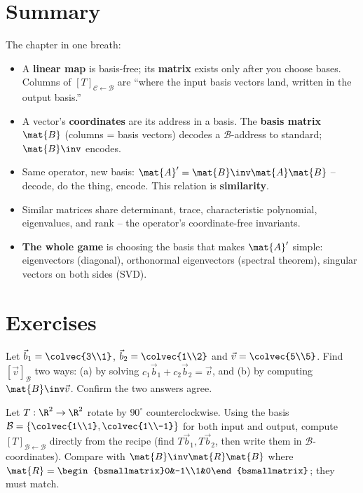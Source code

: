 \section{Summary}
\label{ch31:summary}

\begin{focusbox}
The chapter in one breath:
\begin{itemize}
  \item A \textbf{linear map} is basis-free; its \textbf{matrix} exists only after
        you choose bases. Columns of $[T]_{\mathcal{C}\leftarrow\mathcal{B}}$ are
        ``where the input basis vectors land, written in the output basis.''
  \item A vector's \textbf{coordinates} are its address in a basis. The
        \textbf{basis matrix} $\mat{B}$ (columns = basis vectors) decodes a
        $\mathcal{B}$-address to standard; $\mat{B}\inv$ encodes.
  \item Same operator, new basis: $\mat{A}'=\mat{B}\inv\mat{A}\mat{B}$ -- decode,
        do the thing, encode. This relation is \textbf{similarity}.
  \item Similar matrices share determinant, trace, characteristic polynomial,
        eigenvalues, and rank -- the operator's coordinate-free invariants.
  \item \textbf{The whole game} is choosing the basis that makes $\mat{A}'$
        simple: eigenvectors (diagonal), orthonormal eigenvectors (spectral
        theorem), singular vectors on both sides (SVD).
\end{itemize}
\end{focusbox}

\section*{Exercises}

\begin{exercise}
\label{ch31:ex-address}
Let $\vec{b}_1=\colvec{3\\1}$, $\vec{b}_2=\colvec{1\\2}$ and
$\vec{v}=\colvec{5\\5}$. Find $[\vec{v}]_{\mathcal{B}}$ two ways: (a) by solving
$c_1\vec{b}_1+c_2\vec{b}_2=\vec{v}$, and (b) by computing $\mat{B}\inv\vec{v}$.
Confirm the two answers agree.
\end{exercise}

\begin{exercise}
\label{ch31:ex-build}
Let $T:\R^2\to\R^2$ rotate by $90^\circ$ counterclockwise. Using the basis
$\mathcal{B}=\{\colvec{1\\1},\colvec{1\\-1}\}$ for both input and output, compute
$[T]_{\mathcal{B}\leftarrow\mathcal{B}}$ directly from the recipe (find $T\vec{b}_1,
T\vec{b}_2$, then write them in $\mathcal{B}$-coordinates). Compare with
$\mat{B}\inv\mat{R}\mat{B}$ where $\mat{R}=\begin{bsmallmatrix}0&-1\\1&0\end{bsmallmatrix}$;
they must match.
\end{exercise}

